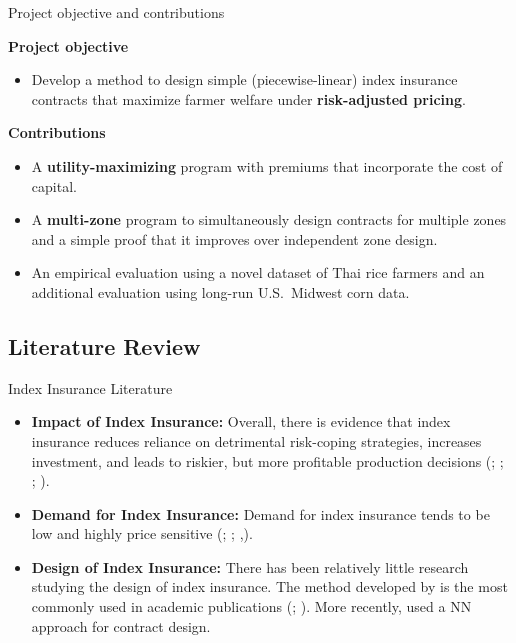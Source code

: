 \documentclass{beamer}
\begin{document}
\begin{frame}{Project objective and contributions}

  \textbf{Project objective}
  \begin{itemize}\itemsep3pt
      \item Develop a method to design simple (piecewise-linear) index insurance contracts
            that maximize farmer welfare under \textbf{risk-adjusted pricing}.
  \end{itemize}
  
  \medskip
  
  \textbf{Contributions}
  \begin{itemize}\itemsep3pt
      \item A \textbf{utility-maximizing} program with premiums that incorporate the cost of capital.
      \item A \textbf{multi-zone} program to simultaneously design contracts for multiple zones and a simple proof that it improves over independent zone design.
      \item An empirical evaluation using a novel dataset of Thai rice farmers and an additional evaluation using
            long-run U.S.\ Midwest corn data.
  \end{itemize}
  
  \end{frame}
  


\subsection{Literature Review}
\begin{frame}{Index Insurance Literature}
    \begin{itemize}
        \item \textbf{Impact of Index Insurance:} Overall, there is evidence that index insurance reduces reliance on detrimental risk-coping strategies, increases investment, and leads to riskier, but more profitable production decisions (\cite{jensen2017agricultural};  \cite{cole2013barriers}; \cite{mobarak2013informal}; \cite{karlan2014agricultural}).
        \item \textbf{Demand for Index Insurance:} Demand for index insurance tends to be low and highly price sensitive (\cite{jensen2017agricultural};  \cite{cole2013barriers}; \cite{cai2020subsidy},\cite{casaburi2018time}).
        \item \textbf{Design of Index Insurance:} There has been relatively little research studying the design of index insurance. The method developed by \cite{chantarat2013designing} is the most commonly used in academic publications (\cite{jensen2019does};  \cite{flatnes2018improving}). More recently, \cite{chen2023managing} used a NN approach for contract design. 
    \end{itemize}
   \end{frame}
\end{document}
